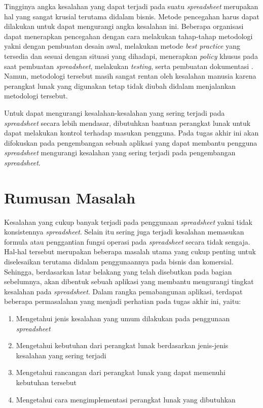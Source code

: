 Tingginya angka kesalahan yang dapat terjadi pada suatu \textit{spreadsheet} merupakan hal yang sangat krusial terutama didalam bisnis. Metode pencegahan harus dapat dilakukan untuk dapat mengurangi angka kesalahan ini. Beberapa organisasi dapat menerapkan pencegahan dengan cara melakukan tahap-tahap metodologi yakni dengan pembuatan desain awal, melakukan metode \textit{best practice} yang tersedia dan sesuai dengan situasi yang dihadapi, menerapkan \textit{policy} khusus pada saat pembuatan \textit{spreadsheet}, melakukan \textit{testing}, serta pembuatan dokumentasi \parencite{EUSPRIGBestPractice}. Namun, metodologi tersebut masih sangat rentan oleh kesalahan manusia karena perangkat lunak yang digunakan tetap tidak diubah didalam menjalankan metodologi tersebut. 

Untuk dapat mengurangi kesalahan-kesalahan yang sering terjadi pada \textit{spreadsheet} secara lebih mendasar, dibutuhkan bantuan perangkat lunak untuk dapat melakukan kontrol terhadap masukan pengguna. Pada tugas akhir ini akan difokuskan pada pengembangan sebuah aplikasi yang dapat membantu pengguna \textit{spreadsheet} mengurangi kesalahan yang sering terjadi pada pengembangan \textit{spreadsheet}.

\section{Rumusan Masalah}

Kesalahan yang cukup banyak terjadi pada penggunaan \textit{spreadsheet} yakni tidak konsistennya \textit{spreadsheet}. Selain itu sering juga terjadi kesalahan memasukan formula atau penggantian fungsi operasi pada \textit{spreadsheet} secara tidak sengaja. Hal-hal tersebut merupakan beberapa masalah utama yang cukup penting untuk diselesaikan terutama didalam penggunaannya pada bisnis dan komersial. Sehingga, berdasarkan latar belakang yang telah disebutkan pada bagian sebelumnya, akan dibentuk sebuah aplikasi yang membantu mengurangi tingkat kesalahan pada \textit{spreadsheet}. Dalam rangka pemabangunan aplikasi, terdapat beberapa permasalahan yang menjadi perhatian pada tugas akhir ini, yaitu:

\begin{enumerate}
    \item Mengetahui jenis kesalahan yang umum dilakukan pada penggunaan \textit{spreadsheet}
    \item Mengetahui kebutuhan dari perangkat lunak berdasarkan jenis-jenis kesalahan yang sering terjadi
    \item Mengetahui rancangan dari perangkat lunak yang dapat memenuhi kebutuhan tersebut
    \item Mengetahui cara mengimplementasi perangkat lunak yang dibutuhkan
\end{enumerate}

